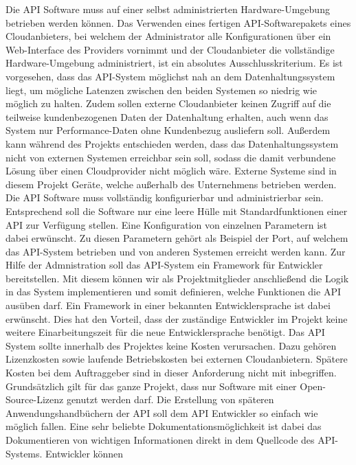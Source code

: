 \begin{outline}
  \1 Die API Software muss auf einer selbst administrierten Hardware-Umgebung
  betrieben werden können. Das Verwenden eines fertigen API-Softwarepakets
  eines Cloudanbieters, bei welchem der Administrator alle Konfigurationen
  über ein Web-Interface des Providers vornimmt und der Cloudanbieter die
  vollständige Hardware-Umgebung administriert, ist ein absolutes
  Ausschlusskriterium. Es ist vorgesehen, dass das API-System möglichst nah an
  dem Datenhaltungssystem liegt, um mögliche Latenzen zwischen den beiden
  Systemen so niedrig wie möglich zu halten. Zudem sollen externe Cloudanbieter
  keinen Zugriff auf die teilweise kundenbezogenen Daten der Datenhaltung
  erhalten, auch wenn das System nur Performance-Daten ohne Kundenbezug
  ausliefern soll. Außerdem kann während des Projekts entschieden werden, dass
  das Datenhaltungssystem nicht von externen Systemen erreichbar sein soll,
  sodass die damit verbundene Lösung über einen Cloudprovider nicht möglich
  wäre. Externe Systeme sind in diesem Projekt Geräte, welche außerhalb des
  Unternehmens betrieben werden.
  \1 Die API Software muss vollständig konfigurierbar und administrierbar sein.
  Entsprechend soll die Software nur eine leere Hülle mit Standardfunktionen
  einer API zur Verfügung stellen. Eine Konfiguration von einzelnen Parametern
  ist dabei erwünscht. Zu diesen Parametern gehört als Beispiel der Port, auf
  welchem das API-System betrieben und von anderen Systemen erreicht werden
  kann. Zur Hilfe der Admnistration soll das API-System ein Framework für
  Entwickler bereitstellen. Mit diesem können wir als Projektmitglieder
  anschließend die Logik in das System implementieren und somit definieren,
  welche Funktionen die API ausüben darf. Ein Framework in einer bekannten
  Entwicklersprache ist dabei erwünscht. Dies hat den Vorteil, dass der
  zuständige Entwickler im Projekt keine weitere Einarbeitungszeit für die neue
  Entwicklersprache benötigt.
  \1 Das API System sollte innerhalb des Projektes keine Kosten verursachen.
  Dazu gehören Lizenzkosten sowie laufende Betriebskosten bei externen
  Cloudanbietern. Spätere Kosten bei dem Auftraggeber sind in dieser
  Anforderung nicht mit inbegriffen. Grundsätzlich gilt für das ganze Projekt,
  dass nur Software mit einer Open-Source-Lizenz genutzt werden darf.
  \1 Die Erstellung von späteren Anwendungshandbüchern der API soll dem API
  Entwickler so einfach wie möglich fallen. Eine sehr beliebte
  Dokumentationsmöglichkeit ist dabei das Dokumentieren von wichtigen
  Informationen direkt in dem Quellcode des API-Systems. Entwickler können

\end{outline}
